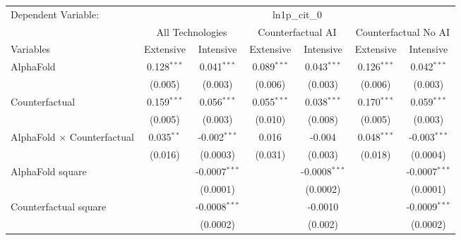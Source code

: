 \begingroup
\centering
\begin{tabular}{lcccccc}
   \tabularnewline \midrule \midrule
   Dependent Variable: & \multicolumn{6}{c}{ln1p\_cit\_0}\\
 & \multicolumn{2}{c}{All Technologies} & \multicolumn{2}{c}{Counterfactual AI} & \multicolumn{2}{c}{Counterfactual No AI} \\
\cmidrule(lr){1-1}\cmidrule(lr){2-3} \cmidrule(lr){4-5} \cmidrule(lr){6-7}
Variables & \multicolumn{1}{c}{Extensive} & \multicolumn{1}{c}{Intensive} & \multicolumn{1}{c}{Extensive} & \multicolumn{1}{c}{Intensive} & \multicolumn{1}{c}{Extensive} & \multicolumn{1}{c}{Intensive} \\
\cmidrule(lr){1-1}\cmidrule(lr){2-2} \cmidrule(lr){3-3} \cmidrule(lr){4-4} \cmidrule(lr){5-5} \cmidrule(lr){6-6} \cmidrule(lr){7-7}
   AlphaFold                          & 0.128$^{***}$ & 0.041$^{***}$     & 0.089$^{***}$ & 0.043$^{***}$   & 0.126$^{***}$ & 0.042$^{***}$\\   
                                      & (0.005)       & (0.003)           & (0.006)       & (0.003)         & (0.006)       & (0.003)\\   
   Counterfactual                     & 0.159$^{***}$ & 0.056$^{***}$     & 0.055$^{***}$ & 0.038$^{***}$   & 0.170$^{***}$ & 0.059$^{***}$\\   
                                      & (0.005)       & (0.003)           & (0.010)       & (0.008)         & (0.005)       & (0.003)\\   
   AlphaFold $\times$ Counterfactual  & 0.035$^{**}$  & -0.002$^{***}$    & 0.016         & -0.004          & 0.048$^{***}$ & -0.003$^{***}$\\   
                                      & (0.016)       & (0.0003)          & (0.031)       & (0.003)         & (0.018)       & (0.0004)\\   
   AlphaFold square                   &               & -0.0007$^{***}$   &               & -0.0008$^{***}$ &               & -0.0007$^{***}$\\   
                                      &               & (0.0001)          &               & (0.0002)        &               & (0.0001)\\   
   Counterfactual square              &               & -0.0008$^{***}$   &               & -0.0010         &               & -0.0009$^{***}$\\   
                                      &               & (0.0002)          &               & (0.002)         &               & (0.0002)\\   

\end{tabular}
